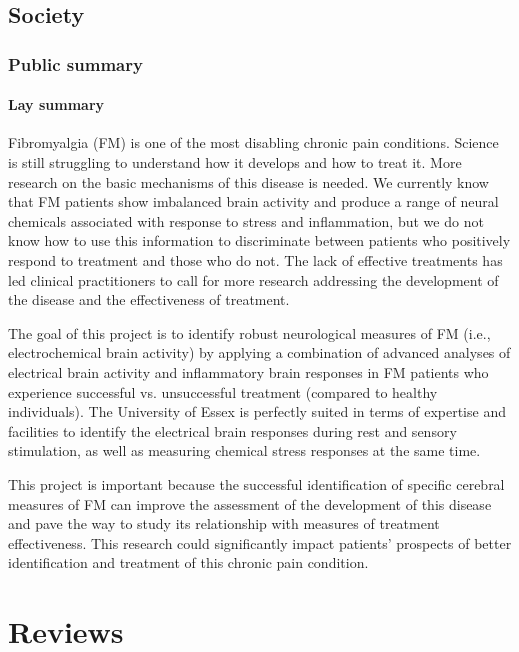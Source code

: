\documentclass[twocolumn,  rga,issue, numeric]{jote-new-article}
\begin{document}
\subsection{Society}



\subsubsection{Public summary}



\noindent\paragraph{\noindent Lay summary}


Fibromyalgia (FM) is one of the most disabling chronic pain conditions.
Science is still struggling to understand how it develops and how to
treat it. More research on the basic mechanisms of this disease is
needed. We currently know that FM patients show imbalanced brain
activity and produce a range of neural chemicals associated with
response to stress and inflammation, but we do not know how to use this
information to discriminate between patients who positively respond to
treatment and those who do not. The lack of effective treatments has led
clinical practitioners to call for more research addressing the
development of the disease and the effectiveness of treatment.

The goal of this project is to identify robust neurological measures of
FM (i.e., electrochemical brain activity) by applying a combination of
advanced analyses of electrical brain activity and inflammatory brain
responses in FM patients who experience successful vs. unsuccessful
treatment (compared to healthy individuals). The University of Essex is
perfectly suited in terms of expertise and facilities to identify the
electrical brain responses during rest and sensory stimulation, as well
as measuring chemical stress responses at the same time.

This project is important because the successful identification of
specific cerebral measures of FM can improve the assessment of the
development of this disease and pave the way to study its relationship
with measures of treatment effectiveness. This research could
significantly impact patients' prospects of better identification and
treatment of this chronic pain condition.


\section{Reviews}
\end{document}

